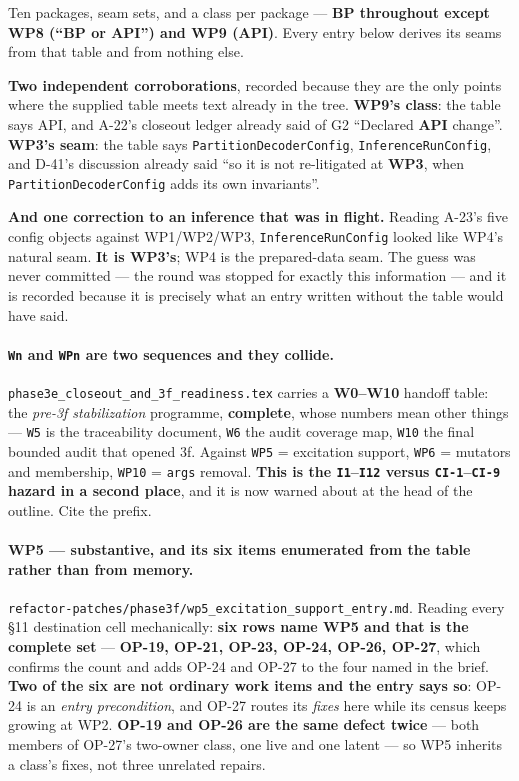 \documentclass[
  10pt,
]{article}
\begin{document}
Ten packages, seam sets, and a class per package --- \textbf{BP throughout except WP8 (``BP or API'') and WP9 (API)}. Every entry below derives its seams from that table and from nothing else.

\textbf{Two independent corroborations}, recorded because they are the only points where the supplied table meets text already in the tree. \textbf{WP9's class}: the table says API, and A-22's closeout ledger already said of G2 ``Declared \textbf{API} change''. \textbf{WP3's seam}: the table says \texttt{PartitionDecoderConfig}, \texttt{InferenceRunConfig}, and D-41's discussion already said ``so it is not re-litigated at \textbf{WP3}, when \texttt{PartitionDecoderConfig} adds its own invariants''.

\textbf{And one correction to an inference that was in flight.} Reading A-23's five config objects against WP1/WP2/WP3, \texttt{InferenceRunConfig} looked like WP4's natural seam. \textbf{It is WP3's}; WP4 is the prepared-data seam. The guess was never committed --- the round was stopped for exactly this information --- and it is recorded because it is precisely what an entry written without the table would have said.

\paragraph{\texttt{Wn} and \texttt{WPn} are two sequences and they collide.}
\texttt{phase3e\_closeout\_and\_3f\_readiness.tex} carries a \textbf{W0--W10} handoff table: the \emph{pre-3f stabilization} programme, \textbf{complete}, whose numbers mean other things --- \texttt{W5} is the traceability document, \texttt{W6} the audit coverage map, \texttt{W10} the final bounded audit that opened 3f. Against \texttt{WP5} = excitation support, \texttt{WP6} = mutators and membership, \texttt{WP10} = \texttt{args} removal. \textbf{This is the \texttt{I1}--\texttt{I12} versus \texttt{CI-1}--\texttt{CI-9} hazard in a second place}, and it is now warned about at the head of the outline. Cite the prefix.

\paragraph{WP5 --- substantive, and its six items enumerated from the table rather than from memory.}
\texttt{refactor-patches/\allowbreak{}phase3f/\allowbreak{}wp5\_excitation\_support\_entry.md}. Reading every \S11 destination cell mechanically: \textbf{six rows name WP5 and that is the complete set} --- \textbf{OP-19, OP-21, OP-23, OP-24, OP-26, OP-27}, which confirms the count and adds OP-24 and OP-27 to the four named in the brief. \textbf{Two of the six are not ordinary work items and the entry says so}: OP-24 is an \emph{entry precondition}, and OP-27 routes its \emph{fixes} here while its census keeps growing at WP2. \textbf{OP-19 and OP-26 are the same defect twice} --- both members of OP-27's two-owner class, one live and one latent --- so WP5 inherits a class's fixes, not three unrelated repairs.
\end{document}
